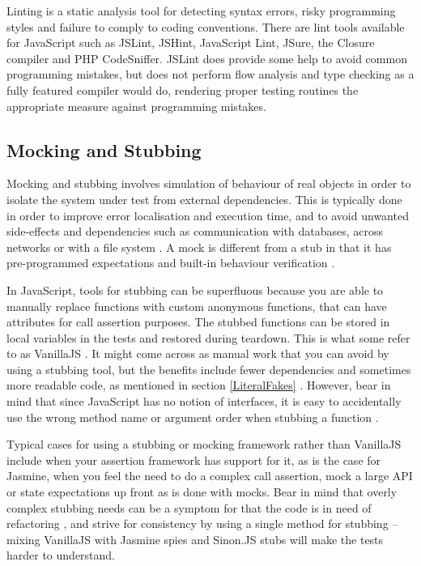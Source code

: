 \documentclass[11pt]{article}
\begin{document}
Linting is a static analysis tool for detecting syntax errors, risky programming styles and failure to comply to coding conventions. There are lint tools available for JavaScript such as JSLint, JSHint, JavaScript Lint, JSure, the Closure compiler and PHP CodeSniffer. JSLint does provide some help to avoid common programming mistakes, but does not perform flow analysis \cite{JSLint} and type checking as a fully featured compiler would do, rendering proper testing routines the appropriate measure against programming mistakes.

\subsection{Mocking and Stubbing}
\label{sec:mocking}

Mocking and stubbing involves simulation of behaviour of real objects in order to isolate the system under test from external dependencies. This is typically done in order to improve error localisation and execution time, and to avoid unwanted side-effects and dependencies such as communication with databases, across networks or with a file system \cite[ch.~2]{Legacy}. A mock is different from a stub in that it has pre-programmed expectations and built-in behaviour verification \cite[p.~453]{Tddjs}.

In JavaScript, tools for stubbing can be superfluous because you are able to manually replace functions with custom anonymous functions, that can have attributes for call assertion purposes. The stubbed functions can be stored in local variables in the tests and restored during teardown. This is what some refer to as VanillaJS \cite[question~53]{Edelstam}. It might come across as manual work that you can avoid by using a stubbing tool, but the benefits include fewer dependencies and sometimes more readable code, as mentioned in section \ref{LiteralFakes} \cite[questions~54-55]{Edelstam}. However, bear in mind that since JavaScript has no notion of interfaces, it is easy to accidentally use the wrong method name or argument order when stubbing a function \cite[p.~471]{Tddjs}.

Typical cases for using a stubbing or mocking framework rather than VanillaJS include when your assertion framework has support for it, as is the case for Jasmine, when you feel the need to do a complex call assertion, mock a large API or state expectations up front as is done with mocks. Bear in mind that overly complex stubbing needs can be a symptom for that the code is in need of refactoring \cite[question~34]{Stenmark}, and strive for consistency by using a single method for stubbing -- mixing VanillaJS with Jasmine spies and Sinon.JS stubs will make the tests harder to understand.
\end{document}
